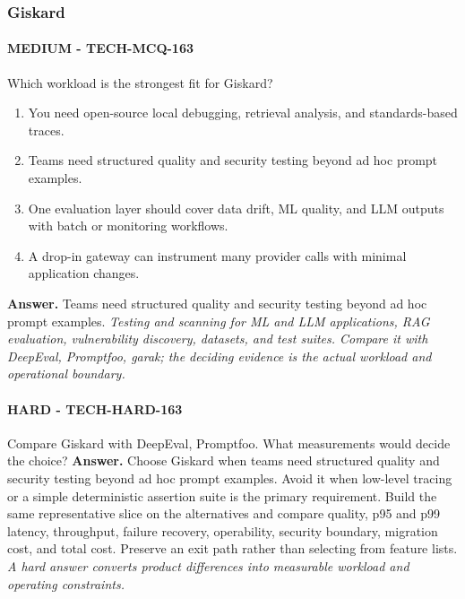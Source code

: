\subsubsection*{Giskard}
\paragraph{MEDIUM - TECH-MCQ-163} Which workload is the strongest fit for Giskard?
\begin{enumerate}[label=\Alph*.]
\item You need open-source local debugging, retrieval analysis, and standards-based traces.
\item Teams need structured quality and security testing beyond ad hoc prompt examples.
\item One evaluation layer should cover data drift, ML quality, and LLM outputs with batch or monitoring workflows.
\item A drop-in gateway can instrument many provider calls with minimal application changes.
\end{enumerate}
\textbf{Answer.} Teams need structured quality and security testing beyond ad hoc prompt examples.
\textit{Testing and scanning for ML and LLM applications, RAG evaluation, vulnerability discovery, datasets, and test suites. Compare it with DeepEval, Promptfoo, garak; the deciding evidence is the actual workload and operational boundary.}
\paragraph{HARD - TECH-HARD-163} Compare Giskard with DeepEval, Promptfoo. What measurements would decide the choice?
\textbf{Answer.} Choose Giskard when teams need structured quality and security testing beyond ad hoc prompt examples. Avoid it when low-level tracing or a simple deterministic assertion suite is the primary requirement. Build the same representative slice on the alternatives and compare quality, p95 and p99 latency, throughput, failure recovery, operability, security boundary, migration cost, and total cost. Preserve an exit path rather than selecting from feature lists.
\textit{A hard answer converts product differences into measurable workload and operating constraints.}
